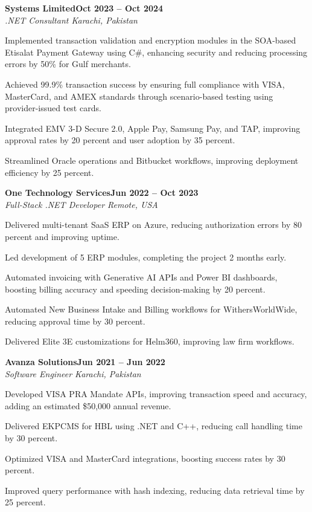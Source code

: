 \documentclass[letterpaper,10pt]{article}
\newcommand{\headingBf}[2]{
  \hspace{10pt}\textbf{#1}\hfill\textbf{#2}\\
}
\newcommand{\headingIt}[2]{
  \hspace{10pt}\textit{#1}\hfill\textit{#2}\\
}
\newenvironment{resume_list}{
  \vspace{-7pt}
  \begin{itemize}[itemsep=-2px, parsep=1pt, leftmargin=30pt]
}{
  \end{itemize}
}
\begin{document}
\headingBf{Systems Limited}{Oct 2023 -- Oct 2024}
\headingIt{.NET Consultant \hfill Karachi, Pakistan}{}
\begin{resume_list}
    \item Implemented transaction validation and encryption modules in the SOA-based Etisalat Payment Gateway using C\#, enhancing security and reducing processing errors by 50\% for Gulf merchants.
    \item Achieved 99.9\% transaction success by ensuring full compliance with VISA, MasterCard, and AMEX standards through scenario-based testing using provider-issued test cards.
    \item Integrated EMV 3-D Secure 2.0, Apple Pay, Samsung Pay, and TAP, improving approval rates by 20 percent and user adoption by 35 percent.
    \item Streamlined Oracle operations and Bitbucket workflows, improving deployment efficiency by 25 percent.
\end{resume_list}

\headingBf{One Technology Services}{Jun 2022 -- Oct 2023}
\headingIt{Full-Stack .NET Developer \hfill Remote, USA}{}
\begin{resume_list}
    \item Delivered multi-tenant SaaS ERP on Azure, reducing authorization errors by 80 percent and improving uptime.
    \item Led development of 5 ERP modules, completing the project 2 months early.
    \item Automated invoicing with Generative AI APIs and Power BI dashboards, boosting billing accuracy and speeding decision-making by 20 percent.
    \item Automated New Business Intake and Billing workflows for WithersWorldWide, reducing approval time by 30 percent.
    \item Delivered Elite 3E customizations for Helm360, improving law firm workflows.
\end{resume_list}

\headingBf{Avanza Solutions}{Jun 2021 -- Jun 2022}
\headingIt{Software Engineer \hfill Karachi, Pakistan}{}
\begin{resume_list}
    \item Developed VISA PRA Mandate APIs, improving transaction speed and accuracy, adding an estimated \$50,000 annual revenue.
    \item Delivered EKPCMS for HBL using .NET and C++, reducing call handling time by 30 percent.
    \item Optimized VISA and MasterCard integrations, boosting success rates by 30 percent.
    \item Improved query performance with hash indexing, reducing data retrieval time by 25 percent.
\end{resume_list}
\end{document}
